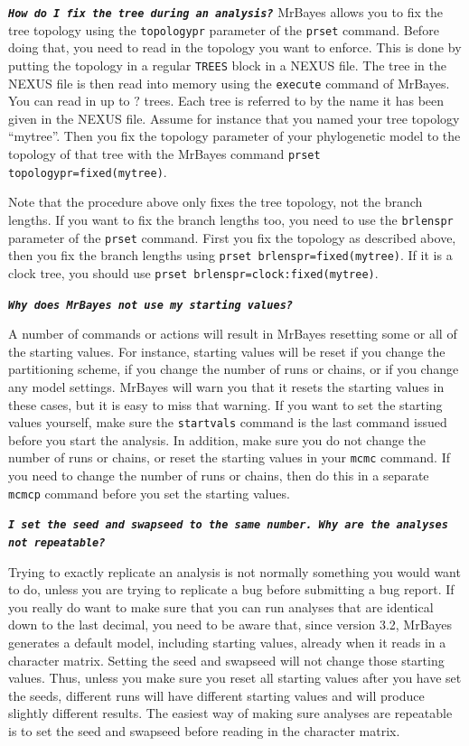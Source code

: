 \documentclass[12pt]{book}
\newcommand{\ttt}[1]{\texttt{#1}}
\newcommand{\tb}[1]{\ttt{\textbf{#1}}}
\begin{document}
\tb{\it{How do I fix the tree during an analysis?}}
MrBayes allows you to fix the tree topology using the \texttt{topologypr} parameter of the
\texttt{prset} command. Before doing that, you need to read in the topology you want to enforce.
This is done by putting the topology in a regular \texttt{TREES} block in a NEXUS file. The tree in
the NEXUS file is then read into memory using the \texttt{execute} command of MrBayes. You can read
in up to $?$ trees.  Each tree is referred to by the name it has been given in the NEXUS file.
Assume for instance that you named your tree topology ``mytree''. Then you fix the topology
parameter of your phylogenetic model to the topology of that tree with the MrBayes command
\texttt{prset topologypr=fixed(mytree)}.

Note that the procedure above only fixes the tree topology, not the branch lengths. If you want to
fix the branch lengths too, you need to use the \texttt{brlenspr} parameter of the \texttt{prset}
command. First you fix the topology as described above, then you fix the branch lengths using
\texttt{prset brlenspr=fixed(mytree)}. If it is a clock tree, you should use \texttt{prset
brlenspr=clock:fixed(mytree)}.

\tb{\it{Why does MrBayes not use my starting values?}}

A number of commands or actions will result in MrBayes resetting some or all of the starting
values. For instance, starting values will be reset if you change the partitioning scheme, if you
change the number of runs or chains, or if you change any model settings. MrBayes will warn you
that it resets the starting values in these cases, but it is easy to miss that warning. If you want
to set the starting values yourself, make sure the \texttt{startvals} command is the last command
issued before you start the analysis. In addition, make sure you do not change the number of runs
or chains, or reset the starting values in your \texttt{mcmc} command. If you need to change the
number of runs or chains, then do this in a separate \texttt{mcmcp} command before you set the
starting values.

\tb{\it{I set the seed and swapseed to the same number. Why are the analyses not repeatable?}}

Trying to exactly replicate an analysis is not normally something you would want to do, unless you
are trying to replicate a bug before submitting a bug report. If you really do want to make sure
that you can run analyses that are identical down to the last decimal, you need to be aware that,
since version 3.2, MrBayes generates a default model, including starting values, already when it
reads in a character matrix. Setting the seed and swapseed will not change those starting values.
Thus, unless you make sure you reset all starting values after you have set the seeds, different
runs will have different starting values and will produce slightly different results. The easiest
way of making sure analyses are repeatable is to set the seed and swapseed before reading in the
character matrix.
\end{document}

